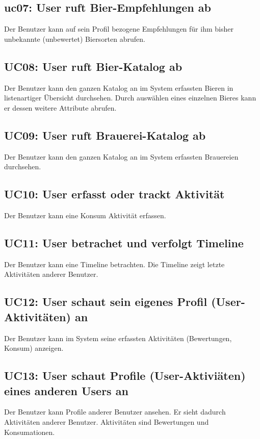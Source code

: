 \documentclass[10pt,a4paper]{scrartcl}
\begin{document}
\subsection*{uc07: User ruft Bier-Empfehlungen ab}
Der Benutzer kann auf sein Profil bezogene Empfehlungen für ihm bisher unbekannte (unbewertet) Biersorten abrufen.
\subsection*{UC08: User ruft Bier-Katalog ab}
Der Benutzer kann den ganzen Katalog an im System erfassten Bieren in listenartiger Übersicht durchsehen. Durch auswählen eines einzelnen Bieres kann er dessen weitere Attribute abrufen.
\subsection*{UC09: User ruft Brauerei-Katalog ab}
Der Benutzer kann den ganzen Katalog an im System erfassten Brauereien durchsehen.
\subsection*{UC10: User erfasst oder trackt Aktivität}
Der Benutzer kann eine Konsum Aktivität erfassen. 
\subsection*{UC11: User betrachet und verfolgt Timeline}
Der Benutzer kann eine Timeline betrachten. Die Timeline zeigt letzte Aktivitäten anderer Benutzer.
\subsection*{UC12: User schaut sein eigenes Profil (User-Aktivitäten) an}
Der Benutzer kann im System seine erfassten Aktivitäten (Bewertungen, Konsum) anzeigen.
\subsection*{UC13: User schaut Profile (User-Aktiviäten) eines anderen Users an}
Der Benutzer kann Profile anderer Benutzer ansehen. Er sieht dadurch Aktivitäten anderer Benutzer. Aktivitäten sind Bewertungen und Konsumationen.
\end{document}
